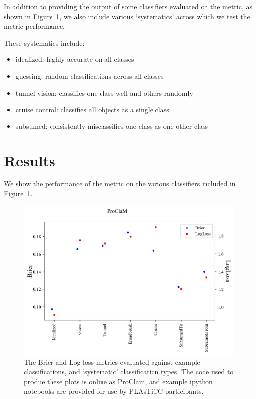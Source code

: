 \documentclass[\docopts]{\docclass}
\begin{document}
\begin{itemize}
In addition to providing the output of some classifiers evaluated on the metric, as shown in Figure~\ref{fig:ProClam}, we also include various `systematics' across which we test the metric performance.

These systematics include:

\begin{itemize}
\item idealized: highly accurate on all classes
\item guessing: random classifications across all classes
\item tunnel vision: classifies one class well and others randomly
\item cruise control: classifies all objects as a single class
\item subsumed: consistently misclassifies one class as one other class
\end{itemize}

\section{Results}
\label{sec:results}


We show the performance of the metric on the various classifiers included in Figure~\ref{fig:ProClam}.

\begin{figure}[htbp!]
\begin{center}
 \includegraphics[width=0.95\linewidth,angle=0]{figures/ProClaM_results.png}
\caption{\label{fig:ProClam} The Brier and Log-loss metrics evaluated against example classifications, and `systematic' classification types. The code used to produe these plots is online as \href{https://github.com/aimalz/proclam/}{ProClam}, and example ipython notebooks are provided for use by PLAsTiCC participants.}
\end{center}
\end{figure}



\end{itemize}
\end{document}
